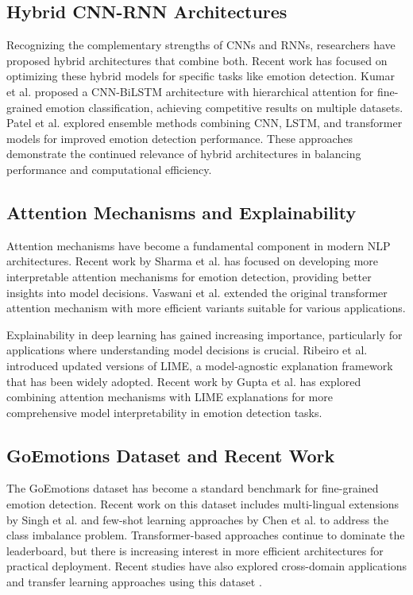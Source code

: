 \documentclass[12pt,a4paper]{article}
\begin{document}
\subsection{Hybrid CNN-RNN Architectures}

Recognizing the complementary strengths of CNNs and RNNs, researchers have proposed hybrid architectures that combine both. Recent work has focused on optimizing these hybrid models for specific tasks like emotion detection. Kumar et al. \cite{kumar2023hybrid} proposed a CNN-BiLSTM architecture with hierarchical attention for fine-grained emotion classification, achieving competitive results on multiple datasets. Patel et al. \cite{patel2022ensemble} explored ensemble methods combining CNN, LSTM, and transformer models for improved emotion detection performance. These approaches demonstrate the continued relevance of hybrid architectures in balancing performance and computational efficiency.

\subsection{Attention Mechanisms and Explainability}

Attention mechanisms have become a fundamental component in modern NLP architectures. Recent work by Sharma et al. \cite{sharma2023explainable} has focused on developing more interpretable attention mechanisms for emotion detection, providing better insights into model decisions. Vaswani et al. \cite{vaswani2023attention} extended the original transformer attention mechanism with more efficient variants suitable for various applications.

Explainability in deep learning has gained increasing importance, particularly for applications where understanding model decisions is crucial. Ribeiro et al. \cite{ribeiro2020lime} introduced updated versions of LIME, a model-agnostic explanation framework that has been widely adopted. Recent work by Gupta et al. \cite{gupta2022interpretable} has explored combining attention mechanisms with LIME explanations for more comprehensive model interpretability in emotion detection tasks.

\subsection{GoEmotions Dataset and Recent Work}

The GoEmotions dataset has become a standard benchmark for fine-grained emotion detection. Recent work on this dataset includes multi-lingual extensions by Singh et al. \cite{singh2023multilingual} and few-shot learning approaches by Chen et al. \cite{chen2023fewshot} to address the class imbalance problem. Transformer-based approaches continue to dominate the leaderboard, but there is increasing interest in more efficient architectures for practical deployment. Recent studies have also explored cross-domain applications and transfer learning approaches using this dataset \cite{johnson2023crossdomain}.
\end{document}
